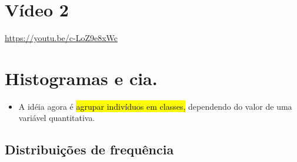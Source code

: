 \documentclass[
  11pt]{report}
\providecommand{\tightlist}{%
  \setlength{\itemsep}{0pt}\setlength{\parskip}{0pt}}
\begin{document}
\hypertarget{vuxeddeo-2-1}{%
\section{Vídeo 2}\label{vuxeddeo-2-1}}

\begin{center} \url{https://youtu.be/c-LoZ9e8xWc} \end{center}

\hypertarget{histogramas-e-cia.}{%
\section{Histogramas e cia.}\label{histogramas-e-cia.}}

\begin{itemize}
\tightlist
\item
  A idéia agora é {\hl{agrupar indivíduos em classes,}} dependendo do valor de uma variável quantitativa.
\end{itemize}

\hypertarget{distribuiuxe7uxf5es-de-frequuxeancia}{%
\subsection{Distribuições de frequência}\label{distribuiuxe7uxf5es-de-frequuxeancia}}
\end{document}
